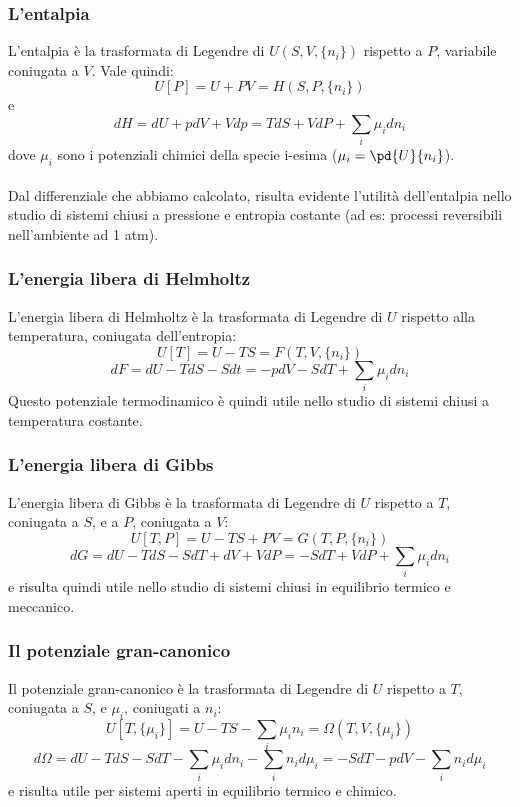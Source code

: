 \documentclass{article}
\begin{document}
\subsubsection{L'entalpia}
L'entalpia è la trasformata di Legendre di $U(S,V,\{n_i\})$ rispetto a $P$, variabile coniugata a $V$. Vale quindi:
$$ U[P] = U+PV=H(S,P,\{n_i\}) $$
e
$$ dH = dU+pdV+Vdp=TdS+VdP+\sum_i\mu_idn_i $$
dove $\mu_i$ sono i potenziali chimici della specie i-esima ($\mu_i=\pd{U}{n_i}$).\\\\
Dal differenziale che abbiamo calcolato, risulta evidente l'utilità dell'entalpia nello studio di sistemi chiusi a pressione e entropia costante (ad es: processi reversibili nell'ambiente ad 1 atm).

\subsubsection{L'energia libera di Helmholtz}
L'energia libera di Helmholtz è la trasformata di Legendre di $U$ rispetto alla temperatura, coniugata dell'entropia:
$$ U[T] = U-TS = F(T,V,\{n_i\}) $$
$$ dF = dU-TdS-Sdt = -pdV-SdT+\sum_i\mu_idn_i$$
Questo potenziale termodinamico è quindi utile nello studio di sistemi chiusi a temperatura costante.

\subsubsection{L'energia libera di Gibbs}
L'energia libera di Gibbs è la trasformata di Legendre di $U$ rispetto a $T$, coniugata a $S$, e a $P$, coniugata a $V$:
$$ U[T,P] = U-TS+PV = G(T,P,\{n_i\}) $$
$$ dG = dU-TdS-SdT +dV+VdP = -SdT + VdP+\sum_i\mu_idn_i $$
e risulta quindi utile nello studio di sistemi chiusi in equilibrio termico e meccanico.

\subsubsection{Il potenziale gran-canonico}
Il potenziale gran-canonico è la trasformata di Legendre di $U$ rispetto a $T$, coniugata a $S$, e $\mu_i$, coniugati a $n_i$:
$$ U[T,\{\mu_i\}]=U-TS-\sum_i\mu_in_i=\Omega(T,V,\{\mu_i\}) $$
$$ d\Omega = dU-TdS-SdT-\sum_i\mu_idn_i-\sum_in_id\mu_i = -SdT-pdV-\sum_in_id\mu_i $$
e risulta utile per sistemi aperti in equilibrio termico e chimico.
\end{document}
